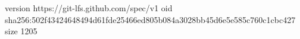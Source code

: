 version https://git-lfs.github.com/spec/v1
oid sha256:502f43424648494d61fde25466ed805b084a3028bb45d6e5e585c760c1cbc427
size 1205
